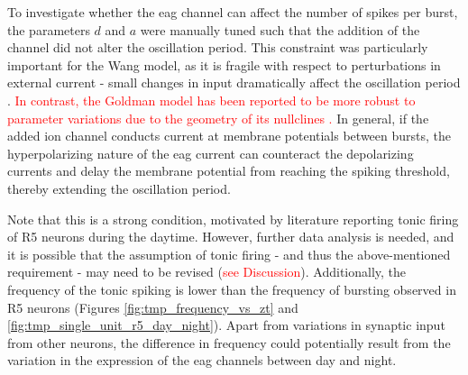 \documentclass[../main.tex]{subfiles}
\begin{document}
To investigate whether the \gls{eag} channel can affect the number of spikes per burst, the parameters $d$ and $a$ were manually tuned such that the addition of the channel did not alter the oscillation period. This constraint was particularly important for the Wang model, as it is fragile with respect to perturbations in external current - small changes in input dramatically affect the oscillation period \cite{wangMultipleDynamicalModes1994}.
\textcolor{red}{In contrast, the Goldman model has been reported to be more robust to parameter variations due to the geometry of its nullclines \parencite{franciRobustTunableBursting2018}.}
In general, if the added ion channel conducts current at membrane potentials between bursts, the hyperpolarizing nature of the \gls{eag} current can counteract the depolarizing currents and delay the membrane potential from reaching the spiking threshold, thereby extending the oscillation period.

Note that this is a strong condition, motivated by literature reporting tonic firing of R5 neurons during the daytime.  However, further data analysis is needed, and it is possible that the assumption of tonic firing - and thus the above-mentioned requirement - may need to be revised (\textcolor{red}{see Discussion}). Additionally, the frequency of the tonic spiking is lower than the frequency of bursting observed in R5 neurons (Figures \ref{fig:tmp_frequency_vs_zt} and \ref{fig:tmp_single_unit_r5_day_night}). Apart from variations in synaptic input from other neurons, the difference in frequency could potentially result from the variation in the expression of the \gls{eag} channels between day and night.

\end{document}
